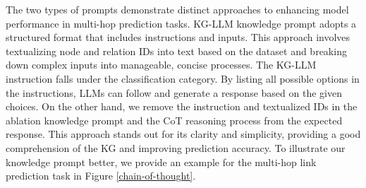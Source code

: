 \documentclass[pmlr]{jmlr}%
\newenvironment{formal}{%
  \begin{mdframed}[style=MyFrame]
  \begin{adjustwidth}{}{1pt}%
  \vspace{0pt}\vspace{0pt}%
}{%
  \vspace{0pt}\vspace{0pt}%
  \end{adjustwidth}%
  \end{mdframed}%
}
\begin{document}

The two types of prompts demonstrate distinct approaches to enhancing model performance in multi-hop prediction tasks. KG-LLM knowledge prompt adopts a structured format that includes instructions and inputs. This approach involves textualizing node and relation IDs into text based on the dataset and breaking down complex inputs into manageable, concise processes. The KG-LLM instruction falls under the classification category. By listing all possible options in the instructions, LLMs can follow and generate a response based on the given choices. On the other hand, we remove the instruction and textualized IDs in the ablation knowledge prompt and the CoT reasoning process from the expected response. This approach stands out for its clarity and simplicity, providing a good comprehension of the KG and improving prediction accuracy. To illustrate our knowledge prompt better, we provide an example for the multi-hop link prediction task in Figure \ref{chain-of-thought}.

\end{document}
